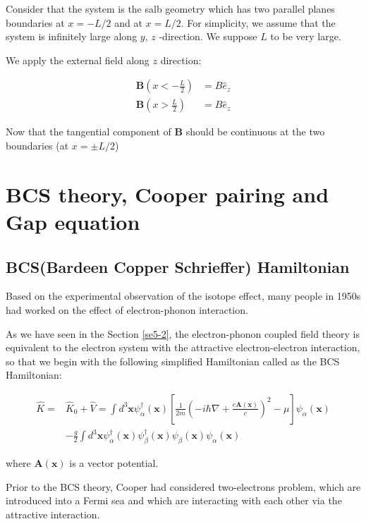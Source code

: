 ﻿\documentclass[twoside]{book}
\numberwithin{equation}{section}
\begin{document}
Consider that the system is the salb geometry which has two parallel planes boundaries at $x = -L/2$ and at $x = L/2$. For simplicity, we assume that the system is infinitely large along $y,\, z$ -direction. We suppose $L$ to be very large. 

We apply the external field along $z$ direction: 

\[\begin{split}
\bm B\left(x < -\frac{L}{2}\right) &= B\hat{e}_z\\
\bm B\left(x > \frac{L}{2}\right) &= B\hat{e}_z
\end{split} \]

Now that the tangential component of $\bm{B}$ should be continuous at the two boundaries (at $x = \pm L/2$)







\section{BCS theory, Cooper pairing and Gap equation}

\subsection{BCS(Bardeen Copper Schrieffer) Hamiltonian}



Based on the experimental observation of the isotope effect, many people in 1950s had worked on the effect of electron-phonon interaction. 

As we have seen in the Section {\ref{se5-2}}, the electron-phonon coupled field theory is equivalent to the electron system with the attractive electron-electron interaction, so that we begin with the following simplified Hamiltonian called as the BCS Hamiltonian: 

\[\begin{split}
\hat{K} =& \hat{K}_0 + \hat{V} = \int d^3 \bm{x} \psi^{\dagger}_{\alpha}(\bm{x})\left[\frac{1}{2m}\left(-i\hbar \nabla + \frac{e\bm{A}(\bm{x})}{c}\right)^2-\mu\right]\psi_{\alpha}(\bm{x})\\
&-\frac{g}{2}\int d^3\bm{x}\psi^{\dagger}_{\alpha}(\bm{x})\psi^{\dagger}_{\beta}(\bm{x})\psi_{\beta}(\bm{x})\psi_{\alpha}(\bm{x})
\end{split} \]

where $\bm{A}(\bm{x})$ is a vector potential. 

Prior to the BCS theory, Cooper had considered two-electrons problem, which are introduced into a Fermi sea and which are interacting with each other via the attractive interaction. 
\end{document}

